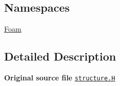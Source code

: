 \subsection*{Namespaces}
\begin{DoxyCompactItemize}
\item 
 \hyperlink{namespaceFoam}{Foam}
\end{DoxyCompactItemize}


\subsection{Detailed Description}
{\bfseries Original source file} \href{../../../home/carlo/data/GeN-Foam/GeN-Foam_ffn/GeN-Foam/GeN-Foam/classes/thermalHydraulics/src/phaseModels/structureModels/structure.H}{\tt structure.\+H} 